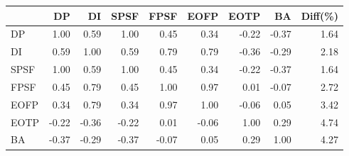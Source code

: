 \begin{tabular}{l|rrrrrrr|r}
\toprule
 & DP & DI & SPSF & FPSF & EOFP & EOTP & BA & Diff(\%)  \\
\midrule
DP & 1.00 & 0.59 & 1.00 & 0.45 & 0.34 & -0.22 & -0.37 & 1.64  \\
DI & 0.59 & 1.00 & 0.59 & 0.79 & 0.79 & -0.36 & -0.29 & 2.18  \\
SPSF & 1.00 & 0.59 & 1.00 & 0.45 & 0.34 & -0.22 & -0.37 & 1.64  \\
FPSF & 0.45 & 0.79 & 0.45 & 1.00 & 0.97 & 0.01 & -0.07 & 2.72  \\
EOFP & 0.34 & 0.79 & 0.34 & 0.97 & 1.00 & -0.06 & 0.05 & 3.42  \\
EOTP & -0.22 & -0.36 & -0.22 & 0.01 & -0.06 & 1.00 & 0.29 & 4.74  \\
BA & -0.37 & -0.29 & -0.37 & -0.07 & 0.05 & 0.29 & 1.00 & 4.27  \\
\bottomrule
\end{tabular}

